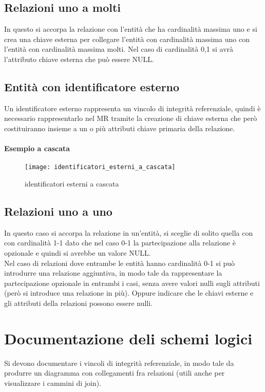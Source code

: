 \subsection{Relazioni uno a molti}
In questo si accorpa la relazione con l'entità che ha cardinalità massima uno e si crea
una chiave esterna per collegare l'entità con cardinalità massima uno con l'entità
con cardinalità massima molti. Nel caso di cardinalità 0,1 si avrà l'attributo chiave esterna che può essere NULL.
\subsection{Entità con identificatore esterno}
Un identificatore esterno rappresenta un vincolo di integrità referenziale, quindi è 
necessario rappresentarlo nel MR tramite la creazione di chiave esterna che però costituiranno
insieme a un o più attributi chiave primaria della relazione.
\paragraph*{Esempio a cascata}
\begin{figure}[h]
    \centering
    \texttt{[image: identificatori\_esterni\_a\_cascata]}
    \caption{identificatori esterni a cascata}
    \label{fig:id-esterni-cascata}
\end{figure}
\subsection{Relazioni uno a uno}
In questo caso si accorpa la relazione in un'entità, si sceglie di solito quella con con cardinalità 1-1 dato
che nel caso 0-1 la partecipazione alla relazione è opzionale e quindi si avrebbe un valore NULL.\\
Nel caso di relazioni dove entrambe le entità hanno cardinalità 0-1 si può introdurre una relazione aggiuntiva, 
in modo tale da rappresentare la partecipazione opzionale in entrambi i casi, senza avere valori nulli
sugli attributi (però si introduce una relazione in più). Oppure indicare che le chiavi esterne e gli attributi
della relazioni possono essere nulli.
\section{Documentazione deli schemi logici}
Si devono documentare i vincoli di integrità referenziale, in modo tale da produrre un diagramma con
collegamenti fra relazioni (utili anche per visualizzare i cammini di join).

